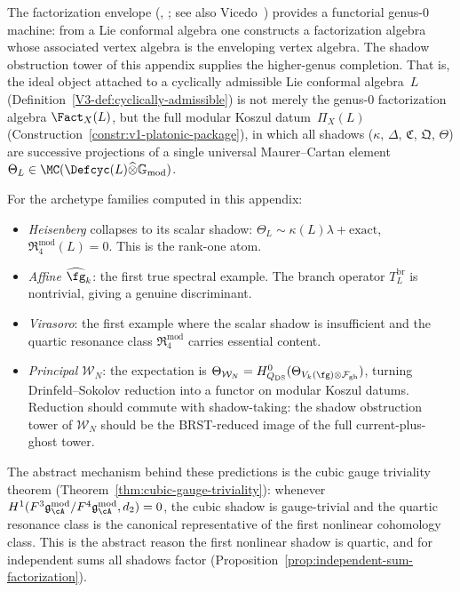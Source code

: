 \begin{remark}
\label{rem:nms-factorization-envelope}
The factorization envelope
\textup{(}\cite[\S3.7]{BD04}, \cite{CG17}; see
also Vicedo~\cite{Vic25}\textup{)} provides a
functorial genus-$0$ machine: from a Lie conformal algebra one
constructs a factorization algebra whose associated vertex algebra
is the enveloping vertex algebra. The shadow obstruction tower of this
appendix supplies the higher-genus completion. That is, the
ideal object attached to a cyclically admissible Lie conformal
algebra~$L$
(Definition~\ref{V3-def:cyclically-admissible}) is not merely the
genus-$0$ factorization algebra $\Fact_X(L)$, but the full
modular Koszul datum~$\Pi_X(L)$
(Construction~\ref{constr:v1-platonic-package}), in which all
shadows ($\kappa$, $\Delta$, $\mathfrak{C}$,
$\mathfrak{Q}$, $\Theta$) are successive projections of a
single universal Maurer--Cartan element
$\Theta_L \in
\MC(\Defcyc(L) \widehat\otimes \mathbb{G}_{\mathrm{mod}})$.

For the archetype families computed in this appendix:
\begin{itemize}
\item \emph{Heisenberg} collapses to its scalar shadow:
 $\Theta_L \sim \kappa(L)\lambda + \text{exact}$,
 $\mathfrak{R}_4^{\mathrm{mod}}(L) = 0$.
 This is the rank-one atom.
\item \emph{Affine $\widehat{\fg}_k$}: the first true spectral
 example. The branch operator $T_L^{\mathrm{br}}$ is
 nontrivial, giving a genuine discriminant.
\item \emph{Virasoro}: the first example where the scalar
 shadow is insufficient and the quartic resonance class
 $\mathfrak{R}_4^{\mathrm{mod}}$ carries essential content.
\item \emph{Principal $\mathcal{W}_N$}: the
 expectation is
 $\Theta_{\mathcal{W}_N}
 = H^0_{Q_{\mathrm{DS}}}(\Theta_{V_k(\fg)\otimes
 \mathcal{F}_{\mathrm{gh}}})$,
 turning Drinfeld--Sokolov reduction into a functor on
 modular Koszul datums. Reduction should commute with
 shadow-taking: the shadow obstruction tower of $\mathcal{W}_N$ should
 be the BRST-reduced image of the full current-plus-ghost
 tower.
\end{itemize}
The abstract mechanism behind these predictions is the
cubic gauge triviality theorem
(Theorem~\ref{thm:cubic-gauge-triviality}):
whenever $H^1(F^3\gAmod/F^4\gAmod, d_2) = 0$, the cubic
shadow is gauge-trivial and the quartic resonance class is
the canonical representative of the first nonlinear
cohomology class. This is the abstract reason the first
nonlinear shadow is quartic, and for independent sums all
shadows factor
(Proposition~\ref{prop:independent-sum-factorization}).
\end{remark}

